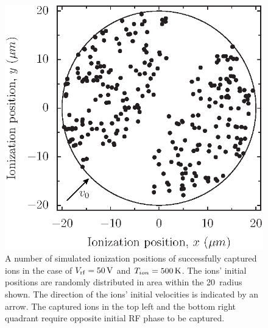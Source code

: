  \begin{figure}[h!t]
 \centering
 \includegraphics{chapter3/tempcapture/ionpos_v2}
 \caption[Ionization positions of successfully trapped ions]{A number of simulated ionization positions of successfully captured ions in the case of $V_{\rm rf} = 50\,\mbox{V}$ and $T_{ion} = 500\,\mbox{K}$. The ions' initial positions are randomly distributed in area within the 20\um\, radius shown. The direction of the ions' initial velocities is indicated by an arrow. The captured ions in the top left and the bottom right quadrant require opposite initial RF phase to be captured.}
 \label{fig:captureposition}
 \end{figure} 


